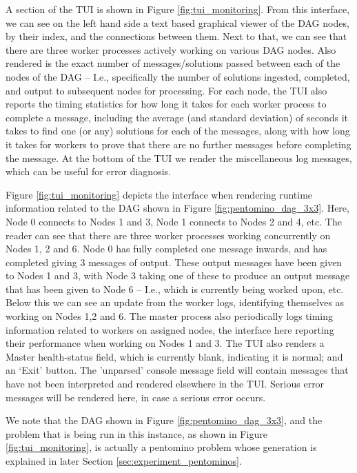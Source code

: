 \documentclass[10pt,a4paper,oneside,headinclude,footinclude,BCOR5mm]{scrartcl}
\begin{document}
A section of the TUI is shown in Figure \ref{fig:tui_monitoring}.
From this interface, we can see on the left hand side a text based graphical viewer of the DAG nodes, by their index, and the connections between them.
Next to that, we can see that there are three worker processes actively working on various DAG nodes.
Also rendered is the exact number of messages/solutions passed between each of the nodes of the DAG -- I.e., specifically the number of solutions ingested, completed, and output to subsequent nodes for processing.
For each node, the TUI also reports the timing statistics for how long it takes for each worker process to complete a message,  including the average (and standard deviation) of seconds it takes to find one (or any) solutions for each of the messages, along with  how long it takes for workers to prove that there are no further messages before completing the message.
At the bottom of the TUI we render the miscellaneous log messages, which can be useful for error diagnosis.

Figure \ref{fig:tui_monitoring} depicts the interface when rendering runtime information related to the DAG shown in Figure \ref{fig:pentomino_dag_3x3}.
Here, Node 0 connects to Nodes 1 and 3, Node 1 connects to Nodes 2 and 4, etc.
The reader can see that there are three worker processes working concurrently on Nodes 1, 2 and 6.
Node 0 has fully completed one message inwards, and has completed giving 3 messages of output.
These output messages have been given to Nodes 1 and 3, with Node 3 taking one of these to produce an output message that has been given to Node 6 -- I.e., which is currently being worked upon, etc.
Below this we can see an update from the worker logs, identifying themselves as working on Nodes 1,2 and 6.
The master process also periodically logs timing information related to workers on assigned nodes, the interface here reporting their performance when working on Nodes 1 and 3. 
The TUI also renders a  Master health-status field, which is currently blank, indicating it is normal; and an `Exit' button.
The 'unparsed' console message field will contain messages that have not been interpreted and rendered elsewhere in the TUI. Serious error messages will be rendered here, in case a serious error occurs.

We note that the DAG shown in Figure \ref{fig:pentomino_dag_3x3}, and the problem that is being run in this instance, as shown in Figure \ref{fig:tui_monitoring}, is actually a pentomino problem whose generation is explained in later Section \ref{sec:experiment_pentominos}.
\end{document}
